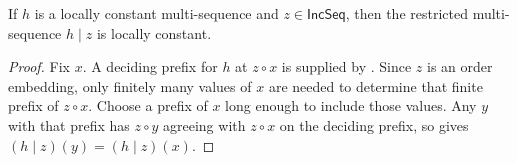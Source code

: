 \begin{lemma}
If $h$ is a locally constant multi-sequence and $z\in\mathsf{IncSeq}$,
then the restricted multi-sequence $h\mathbin{|}z$ is locally constant.
\end{lemma}
\begin{proof}
Fix $x$.  A deciding prefix for $h$ at $z\circ x$ is supplied by
.  Since $z$ is an order embedding, only finitely
many values of $x$ are needed to determine that finite prefix of $z\circ x$.
Choose a prefix of $x$ long enough to include those values.  Any $y$ with
that prefix has $z\circ y$ agreeing with $z\circ x$ on the deciding prefix,
so  gives
$(h\mathbin{|}z)(y)=(h\mathbin{|}z)(x)$.
\end{proof}

